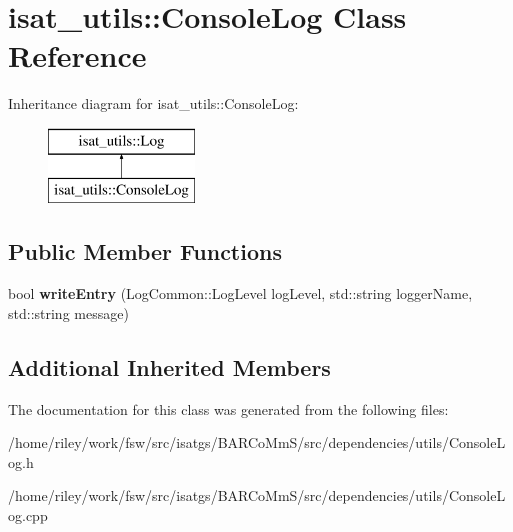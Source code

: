 \hypertarget{classisat__utils_1_1_console_log}{}\section{isat\+\_\+utils\+:\+:Console\+Log Class Reference}
\label{classisat__utils_1_1_console_log}
Inheritance diagram for isat\+\_\+utils\+:\+:Console\+Log\+:\begin{figure}[H]
\begin{center}
\leavevmode
\includegraphics[height=2.000000cm]{classisat__utils_1_1_console_log}
\end{center}
\end{figure}
\subsection*{Public Member Functions}
\begin{DoxyCompactItemize}
\item 
bool {\bfseries write\+Entry} (Log\+Common\+::\+Log\+Level log\+Level, std\+::string logger\+Name, std\+::string message)\hypertarget{classisat__utils_1_1_console_log_a7b11508e2f1c5f6400aac4bf95a1757a}{}\label{classisat__utils_1_1_console_log_a7b11508e2f1c5f6400aac4bf95a1757a}

\end{DoxyCompactItemize}
\subsection*{Additional Inherited Members}


The documentation for this class was generated from the following files\+:\begin{DoxyCompactItemize}
\item 
/home/riley/work/fsw/src/isatgs/\+B\+A\+R\+Co\+Mm\+S/src/dependencies/utils/Console\+Log.\+h\item 
/home/riley/work/fsw/src/isatgs/\+B\+A\+R\+Co\+Mm\+S/src/dependencies/utils/Console\+Log.\+cpp\end{DoxyCompactItemize}
